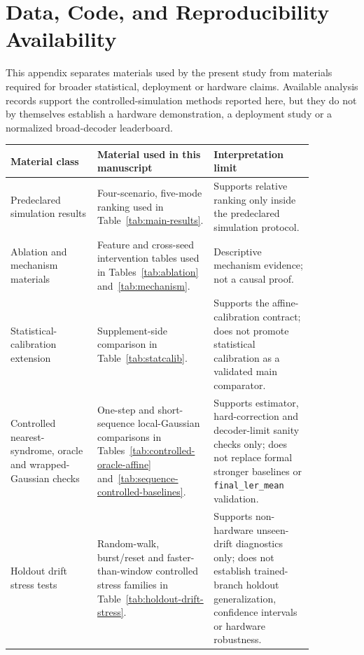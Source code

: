 \documentclass[11pt]{article}
\newcommand{\finalLER}{\texttt{final\_ler\_mean}}
\begin{document}
\section{Data, Code, and Reproducibility Availability}

This appendix separates materials used by the present study from materials
required for broader statistical, deployment or hardware claims.  Available
analysis records support the controlled-simulation methods reported here, but
they do not by themselves establish a hardware demonstration, a deployment
study or a normalized broad-decoder leaderboard.

\begin{table}[htbp]
\centering
\scriptsize
\setlength{\tabcolsep}{4pt}
\begin{tabular}{@{}>{\raggedright\arraybackslash}p{0.26\linewidth}>{\raggedright\arraybackslash}p{0.30\linewidth}>{\raggedright\arraybackslash}p{0.30\linewidth}@{}}
\toprule
Material class & Material used in this manuscript & Interpretation limit \\
\midrule
Predeclared simulation results & Four-scenario, five-mode ranking used in
Table~\ref{tab:main-results}. & Supports relative ranking only inside the
predeclared simulation protocol. \\
\addlinespace
Ablation and mechanism materials & Feature and cross-seed intervention tables
used in Tables~\ref{tab:ablation} and~\ref{tab:mechanism}. & Descriptive
mechanism evidence; not a causal proof. \\
\addlinespace
Statistical-calibration extension & Supplement-side comparison in
Table~\ref{tab:statcalib}. & Supports the affine-calibration contract; does
not promote statistical calibration as a validated main comparator. \\
\addlinespace
Controlled nearest-syndrome, oracle and wrapped-Gaussian checks & One-step and
short-sequence local-Gaussian comparisons in
Tables~\ref{tab:controlled-oracle-affine}
and~\ref{tab:sequence-controlled-baselines}. & Supports estimator,
hard-correction and decoder-limit sanity checks only; does not replace formal
stronger baselines or \finalLER{} validation. \\
\addlinespace
Holdout drift stress tests & Random-walk, burst/reset and faster-than-window
controlled stress families in Table~\ref{tab:holdout-drift-stress}. & Supports
non-hardware unseen-drift diagnostics only; does not establish trained-branch
holdout generalization, confidence intervals or hardware robustness. \\

\end{tabular}
\end{table}
\end{document}

